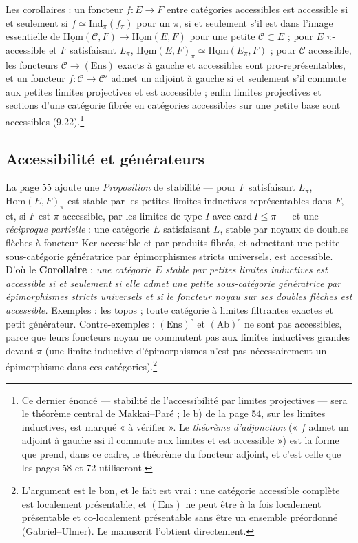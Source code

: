 \documentclass[11pt,a4paper]{article}
\begin{document}
Les corollaires : un foncteur $f : E \to F$ entre catégories accessibles est
accessible si et seulement si $f \simeq \mathrm{Ind}_{\pi}(f_{\pi})$ pour un
$\pi$, si et seulement s'il est dans l'image essentielle de
$\underline{\mathrm{Hom}}(\mathcal{C}, F) \to \underline{\mathrm{Hom}}(E, F)$
pour une petite $\mathcal{C} \subset E$ ; pour $E$ $\pi$-accessible et $F$
satisfaisant $L_{\pi}$, $\underline{\mathrm{Hom}}(E, F)_{\pi} \simeq
\underline{\mathrm{Hom}}(E_{\pi}, F)$ ; pour $\mathcal{C}$ accessible, les
foncteurs $\mathcal{C} \to (\mathrm{Ens})$ exacts à gauche et accessibles
sont pro-représentables, et un foncteur $f : \mathcal{C} \to \mathcal{C}'$
admet un adjoint à gauche si et seulement s'il commute aux petites limites
projectives et est accessible ; enfin limites projectives et sections d'une
catégorie fibrée en catégories accessibles sur une petite base sont
accessibles (9.22).\footnote{Ce dernier énoncé — stabilité de
l'accessibilité par limites projectives — sera le théorème central de
Makkai--Paré ; le b) de la page 54, sur les limites inductives, est marqué
« à vérifier ». Le \emph{théorème d'adjonction} (« $f$ admet un adjoint à
gauche ssi il commute aux limites et est accessible ») est la forme que
prend, dans ce cadre, le théorème du foncteur adjoint, et c'est celle que
les pages 58 et 72 utiliseront.}

\subsection*{Accessibilité et générateurs}

La page 55 ajoute une \emph{Proposition} de stabilité — pour $F$
satisfaisant $L_{\pi}$, $\underline{\mathrm{Hom}}(E, F)_{\pi}$ est stable
par les petites limites inductives représentables dans $F$, et, si $F$ est
$\pi$-accessible, par les limites de type $I$ avec $\mathrm{card}\,I
\leqslant \pi$ — et une \emph{réciproque partielle} : une catégorie $E$
satisfaisant $L$, stable par noyaux de doubles flèches à foncteur $\mathrm{Ker}$
accessible et par produits fibrés, et admettant une petite sous-catégorie
génératrice par épimorphismes stricts universels, est accessible. D'où le
\textbf{Corollaire} : \emph{une catégorie $E$ stable par petites limites
inductives est accessible si et seulement si elle admet une petite
sous-catégorie génératrice par épimorphismes stricts universels et si le
foncteur noyau sur ses doubles flèches est accessible.} Exemples : les
topos ; toute catégorie à limites filtrantes exactes et petit générateur.
Contre-exemples : $(\mathrm{Ens})^{\circ}$ et $(\mathrm{Ab})^{\circ}$ ne
sont pas accessibles, parce que leurs foncteurs noyau ne commutent pas
aux limites inductives grandes devant $\pi$ (une limite inductive
d'épimorphismes n'est pas nécessairement un épimorphisme dans ces
catégories).\footnote{L'argument est le bon, et le fait est vrai : une
catégorie accessible complète est localement présentable, et $(\mathrm{Ens})$
ne peut être à la fois localement présentable et co-localement
présentable sans être un ensemble préordonné (Gabriel--Ulmer). Le
manuscrit l'obtient directement.}
\end{document}
